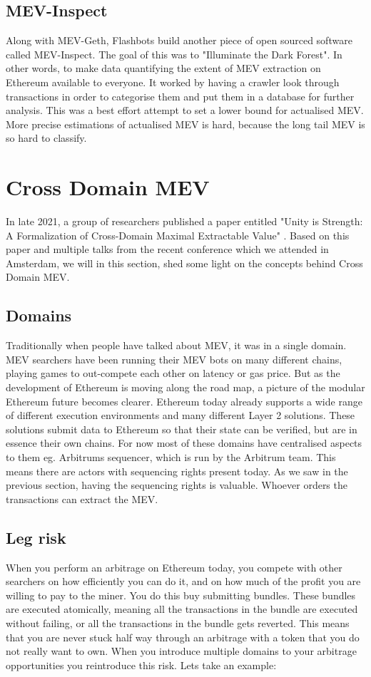 \subsection{MEV-Inspect}

Along with MEV-Geth, Flashbots build another piece of open sourced software called MEV-Inspect. The goal of this was to "Illuminate the Dark Forest". In other words, to make data quantifying the extent of MEV extraction on Ethereum available to everyone. It worked by having a crawler look through transactions in order to categorise them and put them in a database for further analysis. This was a best effort attempt to set a lower bound for actualised MEV. More precise estimations of actualised MEV is hard, because the long tail MEV is so hard to classify. 


\section{Cross Domain MEV}
In late 2021, a group of researchers published a paper entitled "Unity is Strength: A Formalization of Cross-Domain Maximal Extractable Value" \cite{crossdomainMEV}.  Based on this paper and multiple talks from the recent conference \cite{mevday} which we attended in Amsterdam, we will in this section, shed some light on the concepts behind Cross Domain MEV.

\subsection{Domains}
Traditionally when people have talked about MEV, it was in a single domain. MEV searchers have been running their MEV bots on many different chains, playing games to out-compete each other on latency or gas price. But as the development of Ethereum is moving along the road map, a picture of the modular Ethereum future becomes clearer. Ethereum today already supports a wide range of different execution environments and many different Layer 2 solutions. These solutions submit data to Ethereum so that their state can be verified, but are in essence their own chains. For now most of these domains have centralised aspects to them eg. Arbitrums sequencer, which is run by the Arbitrum team. This means there are actors with sequencing rights present today. As we saw in the previous section, having the sequencing rights is valuable. Whoever orders the transactions can extract the MEV. 

\subsection{Leg risk}
When you perform an arbitrage on Ethereum today, you compete with other searchers on how efficiently you can do it, and on how much of the profit you are willing to pay to the miner. You do this buy submitting bundles. These bundles are executed atomically, meaning all the transactions in the bundle are executed without failing, or all the transactions in the bundle gets reverted. This means that you are never stuck half way through an arbitrage with a token that you do not really want to own. When you introduce multiple domains to your arbitrage opportunities you reintroduce this risk. Lets take an example:


